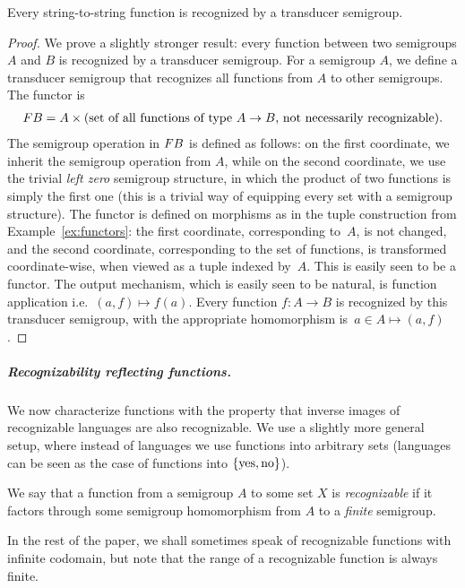 \begin{theorem}\label{thm:all-functions} 
 Every string-to-string function is recognized by a transducer semigroup.
\end{theorem}
\begin{proof}
 We prove a slightly stronger result: every function between two semigroups $A$ and $B$ is recognized by a transducer semigroup.
 For a semigroup $A$, we define a transducer semigroup that recognizes all functions from $A$ to other semigroups. The functor is 
 \begin{align*}
 \functor B = A \times \text{(set of all functions of type $A \to B$, not necessarily recognizable)}.
 \end{align*}
 The semigroup operation in $\functor B$ is defined as follows: on the first coordinate, we inherit the semigroup operation from $A$, while on the second coordinate, we use the trivial \emph{left zero} semigroup structure, in which  the product of two functions is simply the first one (this is a trivial way of equipping every set with a semigroup structure). The functor is defined on morphisms
as in the tuple construction from Example~\ref{ex:functors}: the first coordinate, corresponding to~$A$, is not changed, and the second coordinate, corresponding to the set of functions, is transformed coordinate-wise, when viewed as a tuple indexed by~$A$. This is easily seen to be a functor. The output mechanism, which is easily seen to be natural, is function application i.e.~$(a,f) \mapsto f(a)$.
Every function $f\colon A \to B$ is recognized by this transducer semigroup, with the appropriate homomorphism is~$a \in A \mapsto (a,f)$.
\end{proof}

\subparagraph{Recognizability reflecting functions.} We now characterize
functions with the property that inverse images of recognizable languages are
also recognizable. We use a slightly more general setup, where instead of
languages we use functions into arbitrary sets (languages can be seen as the
case of functions into $\{\text{yes},\text{no}\}$).

\begin{definition}
  We say that a function from a semigroup $A$ to some set $X$ is
  \emph{recognizable} if it factors through some semigroup homomorphism from $A$
  to a \emph{finite} semigroup.
\end{definition}
In the rest of the paper, we shall sometimes
speak of recognizable functions with infinite codomain, but note that the
range of a recognizable function is always finite.

